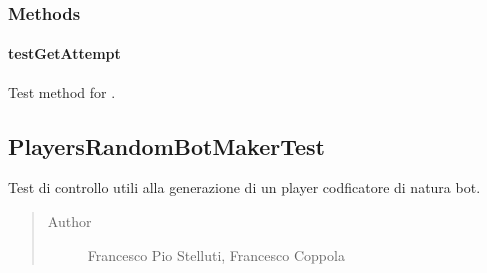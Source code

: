 \documentclass[letterpaper,10pt,italian,openany,oneside]{sphinxmanual}
\begin{document}
\subsubsection{Methods}
\label{\detokenize{test/it/unicam/cs/pa/mastermind/test/PlayersRandomBotBreakerTest:methods}}

\paragraph{testGetAttempt}
\label{\detokenize{test/it/unicam/cs/pa/mastermind/test/PlayersRandomBotBreakerTest:testgetattempt}}

\begin{fulllineitems}
\label{\detokenize{test/it/unicam/cs/pa/mastermind/test/PlayersRandomBotBreakerTest:it.unicam.cs.pa.mastermind.test.PlayersRandomBotBreakerTest.testGetAttempt()}}
Test method for .

\end{fulllineitems}



\subsection{PlayersRandomBotMakerTest}
\label{\detokenize{test/it/unicam/cs/pa/mastermind/test/PlayersRandomBotMakerTest:playersrandombotmakertest}}\label{\detokenize{test/it/unicam/cs/pa/mastermind/test/PlayersRandomBotMakerTest::doc}}

\begin{fulllineitems}
\label{\detokenize{test/it/unicam/cs/pa/mastermind/test/PlayersRandomBotMakerTest:it.unicam.cs.pa.mastermind.test.PlayersRandomBotMakerTest}}
Test di controllo utili alla generazione di un player codficatore di natura bot.
\begin{quote}\begin{description}
\item[{Author}] \leavevmode
Francesco Pio Stelluti, Francesco Coppola

\end{description}\end{quote}

\end{fulllineitems}
\end{document}
